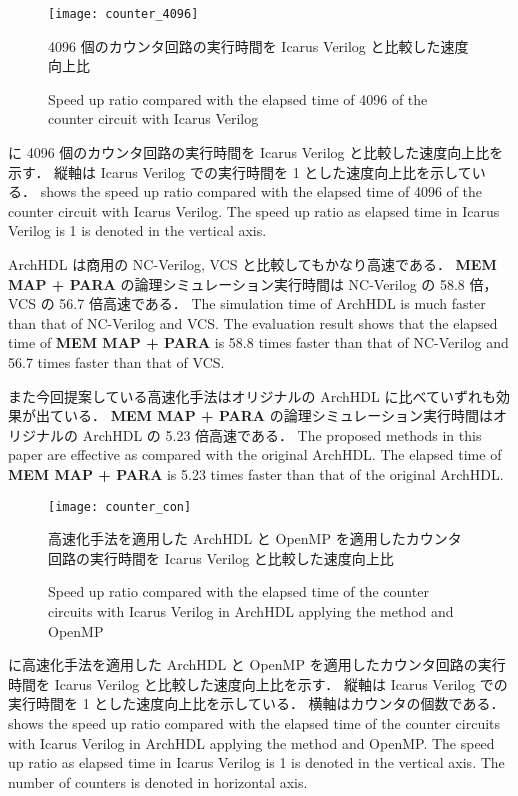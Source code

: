 \begin{figure}[tb]
 \centering
 \texttt{[image: counter\_4096]}
 \caption{4096 個のカウンタ回路の実行時間を Icarus Verilog と比較した速度向上比}
\fi
 \caption{Speed up ratio compared with the elapsed time of 4096 of the counter circuit with Icarus Verilog}
 \label{fig:counter4096}
\end{figure}

 に 4096 個のカウンタ回路の実行時間を Icarus Verilog と比較した速度向上比を示す．
縦軸は Icarus Verilog での実行時間を 1 とした速度向上比を示している．
\fi
{} shows the speed up ratio compared with the elapsed time of 4096 of the counter circuit with Icarus Verilog.
The speed up ratio as elapsed time in Icarus Verilog is 1 is denoted in the vertical axis.

ArchHDL は商用の NC-Verilog, VCS と比較してもかなり高速である．
\textbf{MEM MAP + PARA} の論理シミュレーション実行時間は NC-Verilog の 58.8 倍，VCS の 56.7 倍高速である．
\fi
The simulation time of ArchHDL is much faster than that of NC-Verilog and VCS.
The evaluation result shows that the elapsed time of \textbf{MEM MAP + PARA} is 58.8 times faster than that of NC-Verilog and 56.7 times faster than that of VCS.

また今回提案している高速化手法はオリジナルの ArchHDL に比べていずれも効果が出ている．
\textbf{MEM MAP + PARA} の論理シミュレーション実行時間はオリジナルの ArchHDL の 5.23 倍高速である．
\fi
The proposed methods in this paper are effective as compared with the original ArchHDL.
The elapsed time of \textbf{MEM MAP + PARA} is 5.23 times faster than that of the original ArchHDL.



\begin{figure}[tb]
 \centering
 \texttt{[image: counter\_con]}
 \caption{高速化手法を適用した ArchHDL と OpenMP を適用したカウンタ回路の実行時間を Icarus Verilog と比較した速度向上比}
\fi
 \caption{Speed up ratio compared with the elapsed time of the counter circuits with Icarus Verilog in ArchHDL applying the method and OpenMP}
 \label{fig:counter_con}
\end{figure}

 に高速化手法を適用した ArchHDL と OpenMP を適用したカウンタ回路の実行時間を Icarus Verilog と比較した速度向上比を示す．
縦軸は Icarus Verilog での実行時間を 1 とした速度向上比を示している．
横軸はカウンタの個数である．
\fi
{} shows the speed up ratio compared with the elapsed time of the counter circuits with Icarus Verilog in ArchHDL applying the method and OpenMP.
The speed up ratio as elapsed time in Icarus Verilog is 1 is denoted in the vertical axis.
The number of counters is denoted in horizontal axis.


